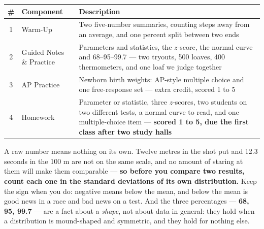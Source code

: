 \documentclass[12pt]{article}
\begin{document}
\boxguard[14]
\begin{tocbox}
\small
\renewcommand{\arraystretch}{1.5}
\begin{tabularx}{\linewidth}{@{} c l X @{}}
\rowcolor{sky}
\textbf{\#} & \textbf{Component} & \textbf{Description} \\
\midrule
1 & Warm-Up & Two five-number summaries, counting steps away from an average, and one percent
                 split between two ends \\
2 & Guided Notes \& Practice & Parameters and statistics, the $z$-score, the normal curve and
                 68--95--99.7 --- two tryouts, 500 loaves, 400 thermometers, and one loaf we
                 judge together \\
3 & AP Practice & Newborn birth weights: AP-style multiple choice and one free-response set ---
                 extra credit, scored 1 to 5 \\
4 & Homework & Parameter or statistic, three $z$-scores, two students on two different tests, a
                 normal curve to read, and one multiple-choice item ---
                 \textbf{scored 1 to 5, due the first class after two study halls} \\
\end{tabularx}
\end{tocbox}

\vspace{0.14in}

\boxguard[8]
\begin{remindbox}
\small
A raw number means nothing on its own. Twelve metres in the shot put and 12.3 seconds in the
100 m are not on the same scale, and no amount of staring at them will make them comparable ---
\textbf{so before you compare two results, count each one in the standard deviations of its own
distribution.} Keep the sign when you do: negative means below the mean, and below the mean is
good news in a race and bad news on a test. And the three percentages --- \textbf{68, 95,
99.7} --- are a fact about a \emph{shape}, not about data in general: they hold when a
distribution is mound-shaped and symmetric, and they hold for nothing else.
\end{remindbox}
\end{document}
